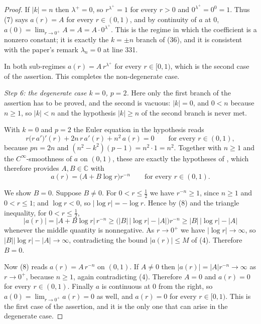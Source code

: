 \begin{proof}
If $|k|=n$ then $\lambda^{+}=0$, so $r^{\lambda^{+}}=1$ for every $r>0$ and
$0^{\lambda^{+}}=0^{0}=1$.  Thus (7) says $a(r)=A$ for every $r\in(0,1)$, and by
continuity of $a$ at $0$, $a(0)=\lim_{r\to0^{+}}A=A=A\cdot0^{\lambda^{+}}$.  This
is the regime in which the coefficient is a nonzero constant; it is exactly the
$k=\pm n$ branch of (36), and it is consistent with the paper's remark
$\lambda_n=0$ at line 331.

In both sub-regimes $a(r)=A\,r^{\lambda^{+}}$ for every $r\in[0,1)$, which is
the second case of the assertion.  This completes the non-degenerate case.

\emph{Step 6: the degenerate case $k=0$, $p=2$.}  Here only the first branch of
the assertion has to be proved, and the second is vacuous: $|k|=0$, and
$0<n$ because $n\ge1$, so $|k|<n$ and the hypothesis $|k|\ge n$ of the second
branch is never met.

With $k=0$ and $p=2$ the Euler equation in the hypothesis reads
\[
  r\bigl(r\,a'\bigr)'(r)+2n\,r\,a'(r)+n^2\,a(r)=0\qquad\text{for every }r\in(0,1),
\]
because $pn=2n$ and $(n^2-k^2)(p-1)=n^2\cdot1=n^2$.  Together with $n\ge1$ and
the $C^\infty$-smoothness of $a$ on $(0,1)$, these are exactly the hypotheses of
, which therefore provides $A,B\in\mathbb{C}$ with
\begin{equation}\tag{8}
  a(r)=\bigl(A+B\log r\bigr)r^{-n}\qquad\text{for every }r\in(0,1).
\end{equation}

We show $B=0$.  Suppose $B\neq0$.  For $0<r\le\tfrac12$ we have $r^{-n}\ge1$,
since $n\ge1$ and $0<r\le1$; and $\log r<0$, so $|\log r|=-\log r$.  Hence by
(8) and the triangle inequality, for $0<r\le\tfrac12$,
\[
  |a(r)|=\bigl|A+B\log r\bigr|\,r^{-n}
  \ge\bigl(|B|\,|\log r|-|A|\bigr)r^{-n}\ge|B|\,|\log r|-|A|
\]
whenever the middle quantity is nonnegative.  As $r\to0^{+}$ we have
$|\log r|\to\infty$, so $|B||\log r|-|A|\to\infty$, contradicting the bound
$|a(r)|\le M$ of (4).  Therefore $B=0$.

Now (8) reads $a(r)=A\,r^{-n}$ on $(0,1)$.  If $A\neq0$ then
$|a(r)|=|A|r^{-n}\to\infty$ as $r\to0^{+}$, because $n\ge1$, again
contradicting (4).  Therefore $A=0$ and $a(r)=0$ for every $r\in(0,1)$.
Finally $a$ is continuous at $0$ from the right, so
$a(0)=\lim_{r\to0^{+}}a(r)=0$ as well, and $a(r)=0$ for every $r\in[0,1)$.
This is the first case of the assertion, and it is the only one that can arise
in the degenerate case.
\end{proof}
